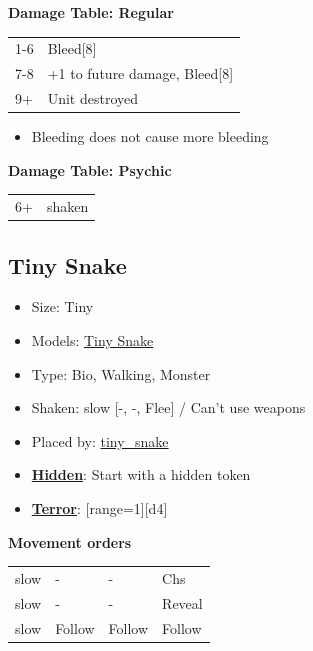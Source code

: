 \documentclass[a4paper,12pt]{article}
\begin{document}
\noindent\textbf{Damage Table: Regular}

\begin{tabular}{@{}lp{}@{}}
1-6 & Bleed[8] \\
7-8 & +1 to future damage, Bleed[8] \\
9+ & Unit destroyed \\
\end{tabular}
\begin{itemize}
\item Bleeding does not cause more bleeding
\end{itemize}
\vspace{1ex}

\noindent\textbf{Damage Table: Psychic}

\begin{tabular}{@{}lp{}@{}}
6+ & shaken \\
\end{tabular}
\vspace{1ex}
\subsection{Tiny Snake}
\label{unit-tiny-snake}

\begin{itemize}
\item Size: Tiny
\item Models: \hyperref[model-tiny-snake]{Tiny Snake}
\item Type: Bio, Walking, Monster
\item Shaken: slow [-, -, Flee] / Can't use weapons
\item Placed by: \hyperref[spawn-tiny-snake]{tiny\_snake}
\item \textbf{\hyperref[rule-special-hidden]{Hidden}}: Start with a hidden token
\item \textbf{\hyperref[rule-special-terror]{Terror}}: [range=1][d4]

\end{itemize}
\noindent\textbf{Movement orders}

\begin{tabular}{llll}
slow & - & - & Chs \\
slow & - & - & Reveal \\
slow & Follow & Follow & Follow \\
\end{tabular}
\vspace{1ex}
\end{document}

